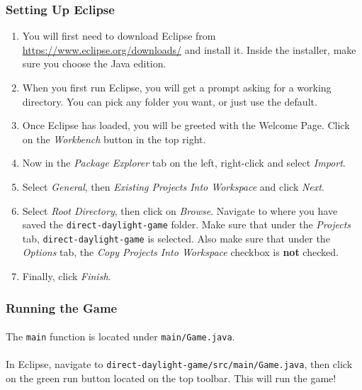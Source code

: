 \documentclass[11pt]{article}
\begin{document}
\subsubsection{Setting Up Eclipse}
\begin{enumerate}
\item You will first need to download Eclipse from \url{https://www.eclipse.org/downloads/} and install it. Inside the installer, make sure you choose the Java edition.
\item When you first run Eclipse, you will get a prompt asking for a working directory. You can pick any folder you want, or just use the default.
\item Once Eclipse has loaded, you will be greeted with the Welcome Page. Click on the \textit{Workbench} button in the top right.
\item Now in the \textit{Package Explorer} tab on the left, right-click and select \textit{Import}.
\item Select \textit{General}, then \textit{Existing Projects Into Workspace} and click \textit{Next}.
\item Select \textit{Root Directory}, then click on \textit{Browse}. Navigate to where you have saved the \lstinline{direct-daylight-game} folder. Make sure that under the \textit{Projects} tab, \lstinline{direct-daylight-game} is selected. Also make sure that under the \textit{Options} tab, the \textit{Copy Projects Into Workspace} checkbox is \textbf{not} checked. 
\item Finally, click \textit{Finish}.
\end{enumerate}
\subsubsection{Running the Game}
\paragraph{}
The \lstinline{main} function is located under \lstinline{main/Game.java}. 
\paragraph{}
In Eclipse, navigate to \lstinline{direct-daylight-game/src/main/Game.java}, then click on the green run button located on the top toolbar. This will run the game!
\end{document}

